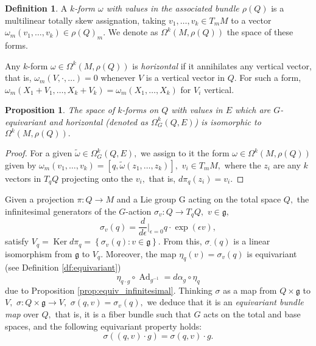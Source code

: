 \documentclass[12pt, letterpaper, reqno]{amsart}
\theoremstyle{definition}
\newtheorem{df}{Definition}
\theoremstyle{plain}
\newtheorem{prop}{Proposition}
\theoremstyle{remark}
\begin{document}
\begin{df}
	A \textit{$ k $-form $ \omega $ with values in the associated bundle $ \rho(Q) $} is a multilinear totally skew assignation, taking $ v_1,\dots, v_k\in T_mM $ to a vector $ \omega_m(v_1,\dots,v_k)\in \rho(Q)_m. $  We denote as $ \Omega^k(M, \rho(Q)) $ the space of these forms.
\end{df}

Any $ k $-form $ \omega\in \Omega^k(M,\rho(Q)) $ is \textit{horizontal} if it annihilates any vertical vector, that is, $ \omega_m(V,\cdot,\dots)=0 $ whenever $ V $ is a vertical vector in $ Q. $ For such a form, $ \omega_m(X_1+V_1,\dots,X_k+V_k)=\omega_m(X_1,\dots, X_k) $ for $ V_i $ vertical.

\begin{prop}
	The space of $ k $-forms on $ Q $ with values in $ E $ which are $ G $-equivariant and horizontal (denoted as $ \Omega^k_G(Q,E) $) is isomorphic to $ \Omega^k(M,\rho(Q)). $ 
\end{prop}
\begin{proof}
	For a given $ \tilde \omega\in\Omega^k_G(Q,E), $ we assign to it the form $ \omega\in\Omega^k(M, \rho(Q)) $ given by $ \omega_m(v_1,\dots,v_k) = [q,\tilde\omega(z_1,\dots,z_k)],  $  $v_i\in T_mM, $ where the $ z_i $ are any $ k $ vectors in $ T_qQ $ projecting onto the $ v_i, $ that is, $ d\pi_q(z_i)=v_i. $  
\end{proof}

Given a projection $ \pi: Q \rightarrow M $ and a Lie group G acting on the total space $ Q, $ the infinitesimal generators of the $ G $-action $ \sigma_v: Q \rightarrow T_qQ, $ $ v\in \mathfrak{g,} $ 
$$ \sigma_v(q) = \frac{d}{d\epsilon} \Big|_{\epsilon=0} q\cdot \operatorname{exp} (\epsilon v),$$
satisfy $ V_q = \operatorname{Ker}d\pi_q = \left\{ \sigma_v(q): v\in \mathfrak{g} \right\} .  $ From this, $ \sigma_\cdot(q) $ is a linear isomorphism from $ \mathfrak{g} $ to $ V_q. $ Moreover, the map $ \eta_q(v)  = \sigma_v(q) $ is equivariant (see Definition \ref{df:equivariant})
$$ \eta_{q\cdot g}\circ \operatorname{Ad}_{g^{-1}} = d\alpha_g  \circ \eta_q $$ 
due to Proposition \ref{prop:equiv_infinitesimal}. Thinking $ \sigma $ as a map from $ Q\times \mathfrak{g} $ to $ V, $ $ \sigma:Q\times \mathfrak{g}\rightarrow V, $ $ \sigma(q,v)= \sigma_v(q), $ we deduce that it is an \textit{equivariant bundle map} over $ Q, $ that is, it is a fiber bundle such that $ G $ acts on the total and base spaces, and the following equivariant property holds:
$$ \sigma \left( (q,v)\cdot g \right) = \sigma(q,v) \cdot g. $$ 
\end{document}
